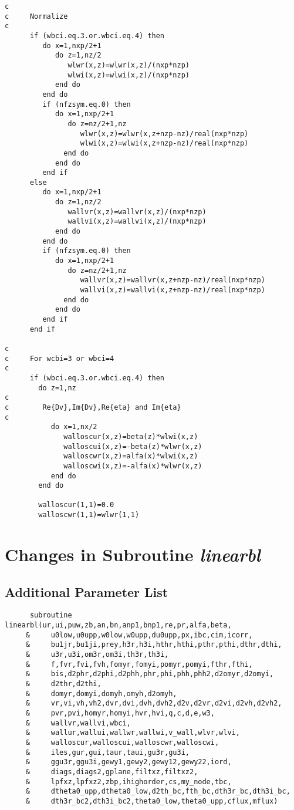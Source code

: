\begin{verbatim}
c
c     Normalize
c
      if (wbci.eq.3.or.wbci.eq.4) then
         do x=1,nxp/2+1
            do z=1,nz/2
               wlwr(x,z)=wlwr(x,z)/(nxp*nzp)
               wlwi(x,z)=wlwi(x,z)/(nxp*nzp)
            end do
         end do
         if (nfzsym.eq.0) then
            do x=1,nxp/2+1
               do z=nz/2+1,nz
                  wlwr(x,z)=wlwr(x,z+nzp-nz)/real(nxp*nzp)
                  wlwi(x,z)=wlwi(x,z+nzp-nz)/real(nxp*nzp)
              end do
            end do
         end if
      else
         do x=1,nxp/2+1
            do z=1,nz/2
               wallvr(x,z)=wallvr(x,z)/(nxp*nzp)
               wallvi(x,z)=wallvi(x,z)/(nxp*nzp)
            end do
         end do
         if (nfzsym.eq.0) then
            do x=1,nxp/2+1
               do z=nz/2+1,nz
                  wallvr(x,z)=wallvr(x,z+nzp-nz)/real(nxp*nzp)
                  wallvi(x,z)=wallvi(x,z+nzp-nz)/real(nxp*nzp)
              end do
            end do
         end if
      end if

c
c     For wcbi=3 or wbci=4   
c
      if (wbci.eq.3.or.wbci.eq.4) then
        do z=1,nz
c
c        Re{Dv},Im{Dv},Re{eta} and Im{eta}
c
           do x=1,nx/2
              walloscur(x,z)=beta(z)*wlwi(x,z)
              walloscui(x,z)=-beta(z)*wlwr(x,z)
              walloscwr(x,z)=alfa(x)*wlwi(x,z)
              walloscwi(x,z)=-alfa(x)*wlwr(x,z)
           end do
        end do

        walloscur(1,1)=0.0
        walloscwr(1,1)=wlwr(1,1) 
\end{verbatim}
\section{Changes in Subroutine \emph{linearbl}}
\subsection*{Additional Parameter List}
\begin{verbatim}
      subroutine linearbl(ur,ui,puw,zb,an,bn,anp1,bnp1,re,pr,alfa,beta,
     &     u0low,u0upp,w0low,w0upp,du0upp,px,ibc,cim,icorr,
     &     bu1jr,bu1ji,prey,h3r,h3i,hthr,hthi,pthr,pthi,dthr,dthi,
     &     u3r,u3i,om3r,om3i,th3r,th3i,
     &     f,fvr,fvi,fvh,fomyr,fomyi,pomyr,pomyi,fthr,fthi,
     &     bis,d2phr,d2phi,d2phh,phr,phi,phh,phh2,d2omyr,d2omyi,
     &     d2thr,d2thi,
     &     domyr,domyi,domyh,omyh,d2omyh,
     &     vr,vi,vh,vh2,dvr,dvi,dvh,dvh2,d2v,d2vr,d2vi,d2vh,d2vh2,
     &     pvr,pvi,homyr,homyi,hvr,hvi,q,c,d,e,w3,
     &     wallvr,wallvi,wbci,
     &     wallur,wallui,wallwr,wallwi,v_wall,wlvr,wlvi,
     &     walloscur,walloscui,walloscwr,walloscwi,
     &     iles,gur,gui,taur,taui,gu3r,gu3i,
     &     ggu3r,ggu3i,gewy1,gewy2,gewy12,gewy22,iord,
     &     diags,diags2,gplane,filtxz,filtxz2,
     &     lpfxz,lpfxz2,zbp,ihighorder,cs,my_node,tbc,
     &     dtheta0_upp,dtheta0_low,d2th_bc,fth_bc,dth3r_bc,dth3i_bc,
     &     dth3r_bc2,dth3i_bc2,theta0_low,theta0_upp,cflux,mflux)
\end{verbatim}

